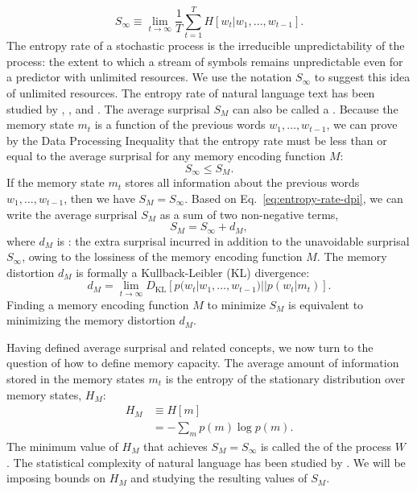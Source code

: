 \begin{equation}
    \label{eq:entropy-rate}
    S_\infty \equiv \lim_{t \rightarrow \infty} \frac{1}{T} \sum_{t=1}^T H[w_t | w_1, \dots, w_{t-1}].
\end{equation}
 The entropy rate of a stochastic process is the irreducible unpredictability of the process: the extent to which a stream of symbols remains unpredictable even for a predictor with unlimited resources. 
 We use the notation $S_\infty$ to suggest this idea of unlimited resources.
 The entropy rate of natural language text has been studied by \citet{shannon1951entropy}, \citet{bentz2017entropy}, and \citet{takahashi2018cross}. 
 The average surprisal $S_M$ can also be called a .  Because the memory state $m_t$ is a function of the previous words $w_1, \dots, w_{t-1}$, we can prove by the Data Processing Inequality \citep[][pp. 34--35]{cover2006elements} that the entropy rate must be less than or equal to the average surprisal for any memory encoding function $M$:
\begin{equation}
    \label{eq:entropy-rate-dpi}
    S_\infty \le S_M.
\end{equation}
If the memory state $m_t$ stores all information about the previous words $w_1, \dots, w_{t-1}$, then we have $S_M = S_\infty$.
Based on Eq.~\ref{eq:entropy-rate-dpi}, we can write the average surprisal $S_M$ as a sum of two non-negative terms,
\begin{equation}
    S_M = S_\infty + d_M,
\end{equation}
where $d_M$ is : the extra surprisal incurred in addition to the unavoidable surprisal $S_\infty$, owing to the lossiness of the memory encoding function $M$. 
The memory distortion $d_M$ is formally a Kullback-Leibler (KL) divergence:
\begin{equation}
    \label{eq:memory-distortion}
    d_M = \lim_{t \rightarrow \infty} D_{\text{KL}} [ p(w_t | w_1, \dots, w_{t-1}) || p(w_t | m_t)].
\end{equation}
Finding a memory encoding function $M$ to minimize $S_M$ is equivalent to minimizing the memory distortion $d_M$.

Having defined average surprisal and related concepts, we now turn to the question of how to define memory capacity. The average amount of information stored in the memory states $m_t$ is the entropy of the stationary distribution over memory states, $H_M$: 
\begin{align}
    \label{eq:memory-entropy}
    H_M &\equiv H[m] \\
    &= - \sum_m p(m) \log p(m).
\end{align}
The minimum value of $H_M$ that achieves $S_M = S_\infty$ is called the  of the process $W$ \citep{shalizi2001computational}. The statistical complexity of natural language has been studied by \citet{hahn2019estimating}. We will be imposing bounds on $H_M$ and studying the resulting values of $S_M$. 

